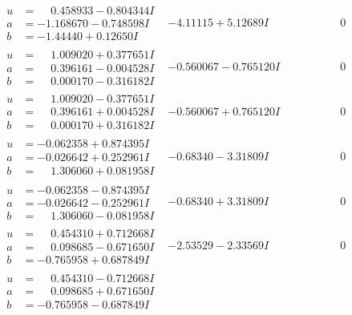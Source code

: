 \documentclass[1p]{elsarticle_modified}
\theoremstyle{definition}
\begin{document}
$$\begin{array}{c|c|c}
\begin{aligned}
u &= \phantom{-}0.458933 - 0.804344 I \\
a &= -1.168670 - 0.748598 I \\
b &= -1.44440 + 0.12650 I\end{aligned}
 & -4.11115 + 5.12689 I & \phantom{-0.000000 } 0 \\ \hline\begin{aligned}
u &= \phantom{-}1.009020 + 0.377651 I \\
a &= \phantom{-}0.396161 - 0.004528 I \\
b &= \phantom{-}0.000170 - 0.316182 I\end{aligned}
 & -0.560067 - 0.765120 I & \phantom{-0.000000 } 0 \\ \hline\begin{aligned}
u &= \phantom{-}1.009020 - 0.377651 I \\
a &= \phantom{-}0.396161 + 0.004528 I \\
b &= \phantom{-}0.000170 + 0.316182 I\end{aligned}
 & -0.560067 + 0.765120 I & \phantom{-0.000000 } 0 \\ \hline\begin{aligned}
u &= -0.062358 + 0.874395 I \\
a &= -0.026642 + 0.252961 I \\
b &= \phantom{-}1.306060 + 0.081958 I\end{aligned}
 & -0.68340 - 3.31809 I & \phantom{-0.000000 } 0 \\ \hline\begin{aligned}
u &= -0.062358 - 0.874395 I \\
a &= -0.026642 - 0.252961 I \\
b &= \phantom{-}1.306060 - 0.081958 I\end{aligned}
 & -0.68340 + 3.31809 I & \phantom{-0.000000 } 0 \\ \hline\begin{aligned}
u &= \phantom{-}0.454310 + 0.712668 I \\
a &= \phantom{-}0.098685 - 0.671650 I \\
b &= -0.765958 + 0.687849 I\end{aligned}
 & -2.53529 - 2.33569 I & \phantom{-0.000000 } 0 \\ \hline\begin{aligned}
u &= \phantom{-}0.454310 - 0.712668 I \\
a &= \phantom{-}0.098685 + 0.671650 I \\
b &= -0.765958 - 0.687849 I\end{aligned}

\end{array}$$
\end{document}
